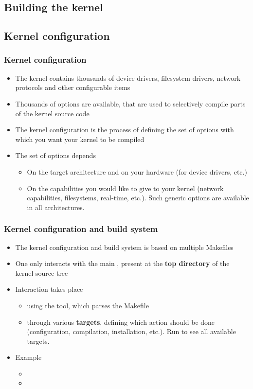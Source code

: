 \subsection{Building the kernel}

\subsection{Kernel configuration}

\begin{frame}
  \frametitle{Kernel configuration}
  \begin{itemize}
  \item The kernel contains thousands of device drivers, filesystem
    drivers, network protocols and other configurable items
  \item Thousands of options are available, that are used to
    selectively compile parts of the kernel source code
  \item The kernel configuration is the process of defining the set of
    options with which you want your kernel to be compiled
  \item The set of options depends
    \begin{itemize}
    \item On the target architecture and on your hardware (for device drivers, etc.)
    \item On the capabilities you would like to give to your kernel
      (network capabilities, filesystems, real-time, etc.).
      Such generic options are available in all architectures.
    \end{itemize}
  \end{itemize}
\end{frame}

\begin{frame}
  \frametitle{Kernel configuration and build system}
  \begin{itemize}
  \item The kernel configuration and build system is based on multiple
    Makefiles
  \item One only interacts with the main , present at
    the {\bf top directory} of the kernel source tree
  \item Interaction takes place
    \begin{itemize}
    \item using the  tool, which parses the Makefile
    \item through various {\bf targets}, defining which action should
      be done (configuration, compilation, installation, etc.). Run
       to see all available targets.
    \end{itemize}
  \item Example
    \begin{itemize}
    \item {}
    \item {}
    \end{itemize}
  \end{itemize}
\end{frame}

